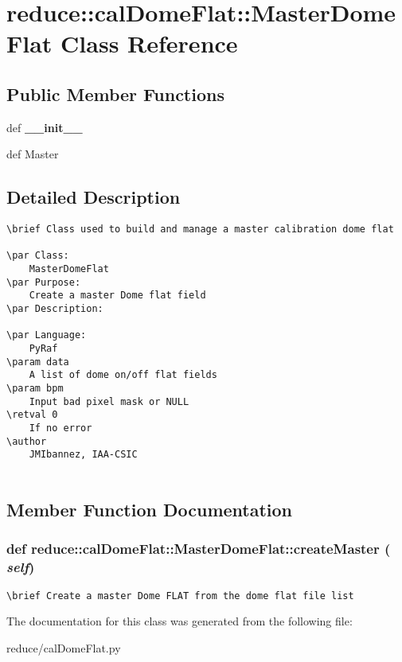 \section{reduce::cal\-Dome\-Flat::Master\-Dome\-Flat Class Reference}
\label{classreduce_1_1calDomeFlat_1_1MasterDomeFlat}
\subsection*{Public Member Functions}
\begin{CompactItemize}
\item 
def \textbf{\_\-\_\-init\_\-\_\-}\label{classreduce_1_1calDomeFlat_1_1MasterDomeFlat_3bd6811f323b8bcffa1e979bcb4f56f6}

\item 
def {\bfcreate\-Master}
\end{CompactItemize}


\subsection{Detailed Description}


\footnotesize\begin{verbatim}
\brief Class used to build and manage a master calibration dome flat

\par Class:
    MasterDomeFlat
\par Purpose:
    Create a master Dome flat field
\par Description:
    
\par Language:
    PyRaf
\param data
    A list of dome on/off flat fields
\param bpm
    Input bad pixel mask or NULL
\retval 0
    If no error
\author
    JMIbannez, IAA-CSIC
  
\end{verbatim}
\normalsize
 



\subsection{Member Function Documentation}
\subsubsection{\setlength{\rightskip}{0pt plus 5cm}def reduce::cal\-Dome\-Flat::Master\-Dome\-Flat::create\-Master ( {\em self})}\label{classreduce_1_1calDomeFlat_1_1MasterDomeFlat_a2bb9721cd2bf963e3954f2232df4d3c}




\footnotesize\begin{verbatim}
\brief Create a master Dome FLAT from the dome flat file list
\end{verbatim}
\normalsize
 

The documentation for this class was generated from the following file:\begin{CompactItemize}
\item 
reduce/cal\-Dome\-Flat.py\end{CompactItemize}
